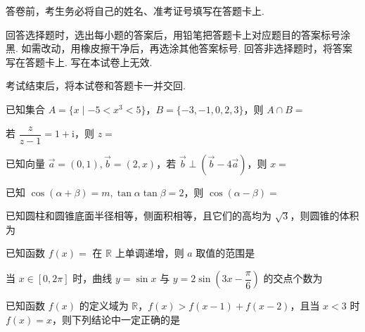 \documentclass[a4paper,11pt]{report}
\begin{document}
\examfontsize



\noticetitle
\begin{examnotice}
\item 答卷前，考生务必将自己的姓名、准考证号填写在答题卡上. 
\item 回答选择题时，选出每小题的答案后，用铅笔把答题卡上对应题目的答案标号涂黑. 如需改动，用橡皮擦干净后，再选涂其他答案标号. 回答非选择题时，将答案写在答题卡上. 写在本试卷上无效. 
\item 考试结束后，将本试卷和答题卡一并交回. 
\end{examnotice}

\begin{examquestions}
\item 已知集合 $A=\{x\mid -5<x^3<5\}$，$B=\{-3,-1,0,2,3\}$，则 $A\cap B=$
\item 若 $\dfrac{z}{z-1}=1+\mathrm{i}$，则 $z=$
\item 已知向量 $\vec a=(0,1),\vec b=(2,x)$，若 $\vec b\perp(\vec b-4\vec a)$，则 $x=$
\item 已知 $\cos(\alpha+\beta)=m,\tan\alpha\tan\beta=2$，则 $\cos(\alpha-\beta)=$
\item 已知圆柱和圆锥底面半径相等，侧面积相等，且它们的高均为 $\sqrt3$，则圆锥的体积为
\item 已知函数 $f(x)=$ 在 $\mathbb R$ 上单调递增，则 $a$ 取值的范围是
\fourchoices{$(-\infty,0]$}{$[-1,0]$}{$[-1,1]$}{$[0,+\infty)$}
\item 当 $x\in[0,2\pi]$ 时，曲线 $y=\sin x$ 与 $y=2\sin\left(3x-\dfrac\pi6\right)$ 的交点个数为
\item 已知函数 $f(x)$ 的定义域为 $\mathbb R$，$f(x)>f(x-1)+f(x-2)$，且当 $x<3$ 时 $f(x)=x$，则下列结论中一定正确的是
\end{examquestions}
\end{document}
